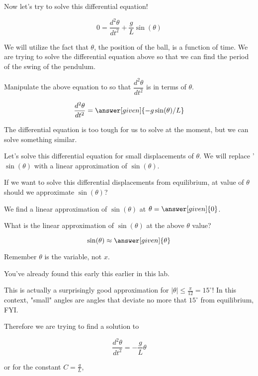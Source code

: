 \documentclass[handout,nooutcomes]{ximera}
\begin{document}
\begin{example}
\begin{explanation}
Now let's try to solve this differential equation!

\[
0 = \dfrac{d^2 \theta}{d t^2}  + \dfrac{g}{L} \sin(\theta)
\]

We will utilize the fact that $\theta$, the position of the ball,
is a function of time. We are trying to solve the differential
equation above so that we can find the period of the swing of the pendulum.

Manipulate the above equation to so that $\dfrac{d^2 \theta}{d t^2}$ is in terms of $\theta$.

\[
\dfrac{d^2 \theta}{d t^2}  = \answer[given]{-g\sin(\theta)/L}
\]

The differential equation is too tough for us to solve at the moment,
but we can solve something similar.

Let's solve this differential equation for small displacements
of $\theta$. We will replace '$\sin(\theta)$ with a linear approximation
of $\sin(\theta)$.

\begin{question}
If we want to solve this differential displacements from equilibrium, at value of $\theta$ should we approximate $\sin(\theta)$?


We find a linear approximation of $\sin(\theta)$ at $\theta = \answer[given]{0}$.

\end{question}

\begin{question}
What is the linear approximation of $\sin(\theta)$ at the above $\theta$ value?

\[
\sin(\theta) \approx \answer[given]{\theta}
\]

\begin{hint}
Remember $\theta$ is the variable, not $x$.
\end{hint}
\begin{hint}
You've already found this early this earlier in this lab.
\end{hint}
\end{question}

This is actually a surprisingly good approximation for
$|\theta|\leq \frac{\pi}{12} = 15^\circ$! In this context, "small" angles
are angles that deviate no more that $15^\circ$ from equilibrium, FYI.

Therefore we are trying to find a solution to

\[
\dfrac{d^2 \theta}{d t^2}  = -\dfrac{g}{L} \theta
\]

or for the constant $C=\frac{g}{L}$,


\end{explanation}
\end{example}
\end{document}
